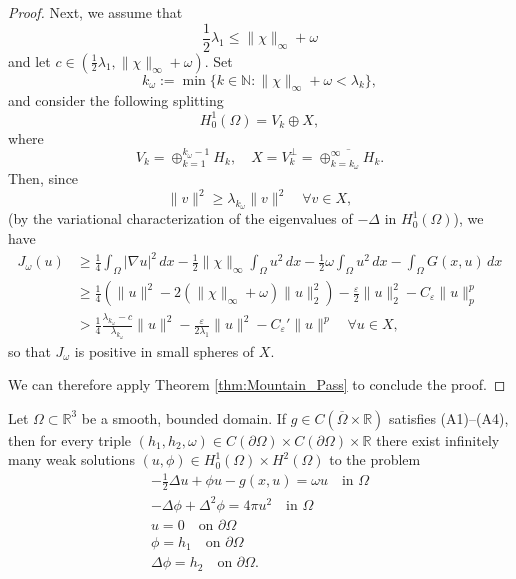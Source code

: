 \documentclass[reqno]{amsart}
\begin{document}
\begin{proof}
Next, we assume that
\begin{equation}
 \label{eq:case_2_Dirichlet}
 \frac{1}{2} \lambda_1 \leq \|\chi\|_\infty + \omega
\end{equation}
and let $c \in \left(\frac{1}{2} \lambda_1, \|\chi\|_\infty + \omega \right)$. Set
\[
 k_\omega := \min\{k \in \mathbb N  :  \|\chi\|_\infty + \omega < \lambda_k\},
\]
and consider the following splitting 
\[
 H_0^1(\Omega) = V_k \oplus X,
\]
where
\[
 V_k = \oplus_{k = 1}^{k_\omega - 1} H_k, \quad 
 X = V_k^\perp = \overline{\oplus_{k = k_\omega}^\infty H_k}.
\]
Then, since
 \[
 \|v\|^2 \geq \lambda_{k_\omega} \|v\|^2 \quad \forall v \in X,
 \]
(by the variational characterization of the eigenvalues of $- \Delta$ in 
$H_0^1(\Omega)$), we have
\begin{align*}
 J_\omega(u)
& \geq \frac{1}{4} \int_\Omega |\nabla u|^2 \,dx 
 - \frac{1}{2} \|\chi\|_\infty \int_\Omega u^2 \,dx 
 - \frac{1}{2} \omega \int_\Omega u^2 \,dx - \int_\Omega G(x, u) \,dx  \\
& \geq \frac{1}{4}(\|u\|^2 - 2(\|\chi\|_\infty + \omega) \|u\|_2^2) 
 - \frac{\varepsilon}{2} \|u\|_2^2 - C_\varepsilon \|u\|_p^p  \\
& > \frac{1}{4} \frac{\lambda_{k_\omega} - c}{\lambda_{k_\omega}}\|u\|^2
 - \frac{\varepsilon}{2 \lambda_1} \|u\|^2 - C_\varepsilon' \|u\|^p \quad 
 \forall u \in X,
\end{align*}
so that $J_\omega$ is positive in small spheres of $X$.

We can therefore apply Theorem \ref{thm:Mountain_Pass} to conclude the proof.
\end{proof}

\begin{theorem}
 \label{thm:main_Dirichlet}
Let $\Omega \subset \mathbb R^3$ be a smooth, bounded domain. 
If $g \in C(\overline \Omega \times \mathbb R)$ satisfies {\rm (A1)--(A4)}, 
then for every triple $(h_1, h_2, \omega) \in C(\partial\Omega) \times C(\partial\Omega) \times \mathbb R$
there exist infinitely many weak solutions 
$(u, \phi) \in H_0^1(\Omega) \times H^2(\Omega)$ to the problem
 \begin{gather*}
 - \frac{1}{2} \Delta u + \phi u - g(x, u)  =  \omega u  \quad \text{in } \Omega \\
 - \Delta \phi + \Delta^2 \phi  =  4 \pi u^2  \quad \text{in } \Omega \\
 u  =  0  \quad \text{on } \partial\Omega \\
 \phi  =  h_1  \quad \text{on } \partial\Omega \\
 \Delta \phi  =  h_2  \quad \text{on } \partial\Omega.
 \end{gather*}
\end{theorem}
\end{document}
